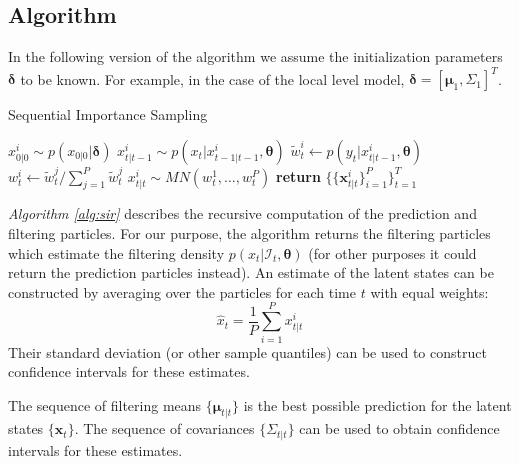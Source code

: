 \documentclass[11pt, oneside]{scrreprt}   	%
\begin{document}
\subsection{Algorithm}
In the following version of the algorithm we assume the initialization parameters $\boldsymbol{\delta}$ to be known. For example, in the case of the local level model, $\boldsymbol{\delta} = [\boldsymbol{\mu}_1, \Sigma_1]^T$.\\

\begin{algorithm}[h!]
\caption{Sequential Importance Sampling}
\label{alg:sir}
\begin{algorithmic}[1]
      	\smallskip
		\State $x_{0 | 0 }^i \sim p(x_{0 | 0 } | \boldsymbol{\delta})$ 
	\EndFor
      	\smallskip
      			\State $x_{t | t-1}^i \sim p(x_t | x_{t-1 | t-1}^i, \boldsymbol{\theta})$ 
			\smallskip
      			\State $\tilde{w}_t^i \gets p(y_t | x_{t | t-1}^i, \boldsymbol{\theta})$ 
		\EndFor	
		\smallskip
			\State $w_t^i \gets \tilde{w}_t^j / \sum_{j=1}^P \tilde{w}_t^j$ 
		\EndFor	
		\smallskip
			\State $x_{t | t }^i \sim MN(w_t^1, \ldots, w_t^P)$ 
		\EndFor
      \EndFor
      \State \textbf{return} $\{\{\boldsymbol{x}_{t | t}^i\}_{i=1}^P\}_{t=1}^T$
    \EndProcedure
  \end{algorithmic}
\end{algorithm}
\textit{Algorithm \ref{alg:sir}} describes the recursive computation of the prediction and filtering particles.  
For our purpose, the algorithm returns the filtering particles which estimate the filtering density $p(x_t | \mathcal{I}_t, \boldsymbol{\theta})$ (for other purposes it could return the prediction particles instead). 
An estimate of the latent states can be constructed by averaging over the particles for each time $t$ with equal weights: 
$$
\hat{x}_t = \frac{1}{P}\sum_{i=1}^P x_{t | t}^i
$$
Their standard deviation (or other sample quantiles) can be used to construct confidence intervals for these estimates. 

The sequence of filtering means $\{\boldsymbol{\mu}_{t | t}\}$ is the best possible prediction for the latent states $\{\boldsymbol{x}_t\}$. 
The sequence of covariances $\{\Sigma_{t | t}\}$ can be used to obtain confidence intervals for these estimates. \\  
\end{document}
